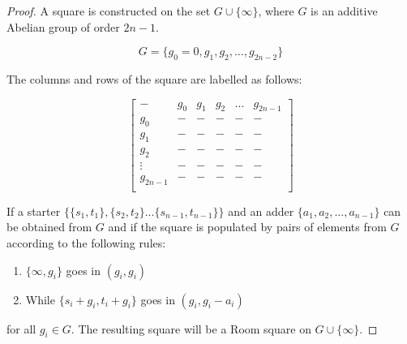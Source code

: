 \documentclass[
  11pt,
  a4paper]{book}
\begin{document}
\begin{proof}
A square is constructed on the set $G \cup \{\infty\}$, where $G$ is an
additive Abelian group of order $2n-1$.

\begin{equation}
G = \{g_0 = 0, g_1, g_2, \ldots, g_{2n-2}\}
\end{equation}

The columns and rows of the square are labelled as follows:

\begin{equation}
  \begin{bmatrix}
        -      & g_0  &  g_1  &  g_2  & \ldots &  g_{2n - 1} \\
       g_0     &   -  &   -   &   -   &    -   &     -       \\
       g_1     &   -  &   -   &   -   &    -   &     -       \\
       g_2     &   -  &   -   &   -   &    -   &     -       \\
     \vdots    &   -  &   -   &   -   &    -   &     -       \\
    g_{2n - 1} &   -  &   -   &   -   &    -   &     -       \\
  \end{bmatrix}
\end{equation}

If a starter
$\{\{s_1, t_1\}, \{s_2, t_2\} \ldots \{s_{n - 1}, t_{n - 1}\}\}$
and an
adder $\{a_1, a_2, \ldots, a_{n - 1}\}$ can be obtained from
$G$ and if the square is populated by pairs of elements from
$G$ according to the following rules:

\begin{enumerate}
  \item{$\{\infty, g_i\}$ goes in $(g_i, g_i)$}
  \item{While $\{s_i + g_i, t_i + g_i\}$ goes in $(g_i, g_i - a_i)$}
\end{enumerate}

for all $g_i \in G$. The resulting square will be a Room square on
$G \cup \{\infty\}$.


\end{proof}
\end{document}
